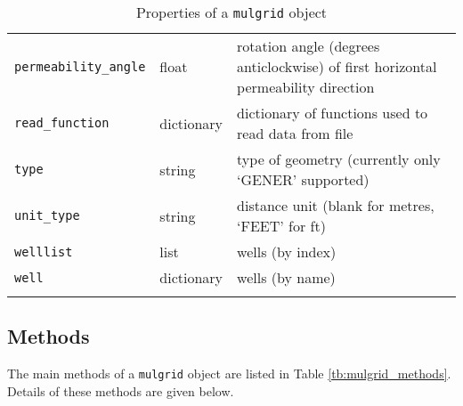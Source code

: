 \begin{center}
\begin{longtable}{|l|l|p{75mm}|}
    \texttt{permeability\_angle} & float & rotation angle (degrees anticlockwise) of first horizontal permeability direction \\
    \texttt{read\_function} & dictionary & dictionary of functions used to read data from file\\
    \texttt{type} & string  & type of geometry (currently only `GENER' supported)\\
    \texttt{unit\_type} & string & distance unit (blank for metres, `FEET' for ft)\\
    \texttt{welllist} & list & wells (by index)\\
    \texttt{well} & dictionary & wells (by name)\\
    \hline
    \caption{Properties of a \texttt{mulgrid} object}
    \label{tb:mulgrid_properties}
  \end{longtable}
\end{center}

\subsection{Methods}
\label{mulgridmethods}

The main methods of a \texttt{mulgrid} object are listed in Table \ref{tb:mulgrid_methods}.  Details of these methods are given below.

